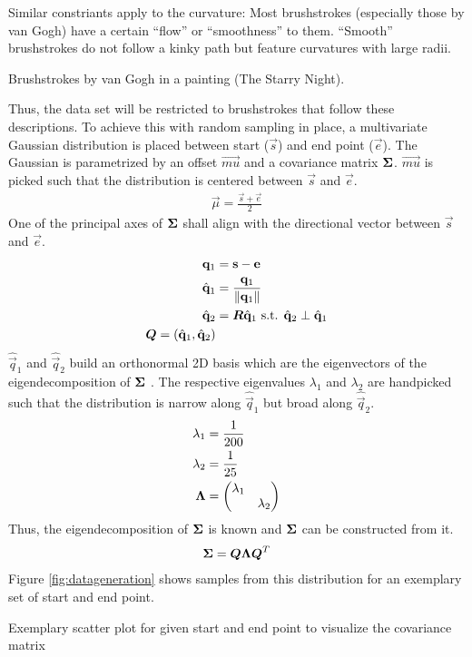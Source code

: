Similar constriants apply to the curvature:
Most brushstrokes (especially those by van Gogh) have a certain ``flow'' or ``smoothness'' to them.
``Smooth'' brushstrokes do not follow a kinky path but feature curvatures with large radii.\\
\begin{marginfigure}
    \caption[]{Brushstrokes by van Gogh in a painting (The Starry Night).}
\end{marginfigure}
Thus, the data set will be restricted to brushstrokes that follow these descriptions.
To achieve this with random sampling in place, a multivariate Gaussian distribution is placed between start ($\vec{s}$) and end point ($\vec{e}$).
The Gaussian is parametrized by an offset $\vec{mu}$ and a covariance matrix $\boldsymbol{\Sigma}$.
$\vec{mu}$ is picked such that the distribution is centered between $\vec{s}$ and $\vec{e}$.
\begin{align}
    \vec{\mu} = \frac{\vec{s} + \vec{e}}{2}
\end{align}
One of the principal axes of $\boldsymbol{\Sigma}$ shall align with the directional vector between $\vec{s}$ and $\vec{e}$.
\begin{align}
    \mathbf{q}_1 & = \mathbf{s} - \mathbf{e} \\
    \hat{\mathbf{q}}_1 & = \frac{\mathbf{q}_1}{\left\lVert\mathbf{q}_1\right\rVert} \\
    \hat{\mathbf{q}}_2 & = \boldsymbol{R} \hat{\mathbf{q}}_1 \text{ s.t. } \hat{\mathbf{q}}_2 \perp \hat{\mathbf{q}}_1 \\
    \boldsymbol{Q} = (\hat{\mathbf{q}}_1, \hat{\mathbf{q}}_2)
\end{align}
$\hat{\vec{q}}_1$ and $\hat{\vec{q}}_2$ build an orthonormal 2D basis which are the eigenvectors of the eigendecomposition of $\boldsymbol{\Sigma}$ .
The respective eigenvalues $\lambda_1$ and $\lambda_2$ are handpicked such that the distribution is narrow along $\hat{\vec{q}}_1$ but broad along $\hat{\vec{q}}_2$.
\begin{align}
    \lambda_1 & = \frac{1}{200} \\
    \lambda_2 & = \frac{1}{25} \\
    \boldsymbol{\Lambda} & = \begin{pmatrix} \lambda_1 & \\ & \lambda_2 \end{pmatrix}
\end{align}
Thus, the eigendecomposition of $\boldsymbol{\Sigma}$ is known and $\boldsymbol{\Sigma}$ can be constructed from it.
\begin{align}
    \boldsymbol{\Sigma} = \boldsymbol{Q} \boldsymbol{\Lambda} \boldsymbol{Q}^T
\end{align}
Figure \ref{fig:datageneration} shows samples from this distribution for an exemplary set of start and end point.
\begin{marginfigure}
    \resizebox{\textwidth}{!}{
        
    }
    \caption[]{Exemplary scatter plot for given start and end point to visualize the covariance matrix}
\end{marginfigure}

